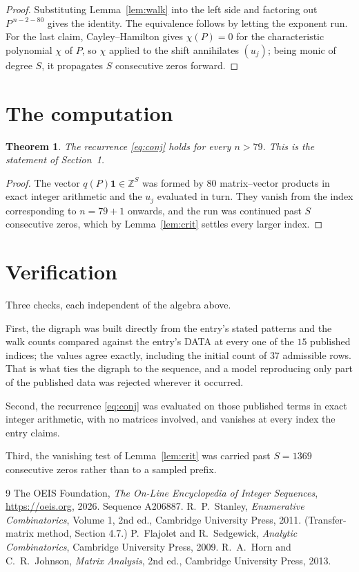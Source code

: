 \documentclass[11pt,a4paper]{article}
\theoremstyle{plain}
\newtheorem{theorem}{Theorem}
\theoremstyle{definition}
\begin{document}
\begin{proof}
Substituting Lemma~\ref{lem:walk} into the left side and factoring out
$P^{\,n-2-80}$ gives the identity. The equivalence follows by letting the exponent
run. For the last claim, Cayley--Hamilton gives $\chi(P)=0$ for the characteristic
polynomial $\chi$ of $P$, so $\chi$ applied to the shift annihilates $(u_j)$; being monic of
degree $S$, it propagates $S$ consecutive zeros forward.
\end{proof}

\section{The computation}

\begin{theorem}
The recurrence \eqref{eq:conj} holds for every $n>79$. This is the statement of
Section~1.
\end{theorem}

\begin{proof}
The vector $q(P)\mathbf{1}\in\mathbb{Z}^{S}$ was formed by $80$ matrix--vector
products in exact integer arithmetic and the $u_j$ evaluated in turn. They vanish from the
index corresponding to $n=79+1$ onwards, and the run was continued past $S$ consecutive
zeros, which by Lemma~\ref{lem:crit} settles every larger index.
\end{proof}

\section{Verification}

Three checks, each independent of the algebra above.

First, the digraph was built directly from the entry's stated patterns and the walk counts
compared against the entry's DATA at every one of the $15$ published indices; the
values agree exactly, including the initial count of $37$ admissible rows. That is
what ties the digraph to the sequence, and a model reproducing only part of the published
data was rejected wherever it occurred.

Second, the recurrence \eqref{eq:conj} was evaluated on those published terms in exact
integer arithmetic, with no matrices involved, and vanishes at every index the entry claims.

Third, the vanishing test of Lemma~\ref{lem:crit} was carried past $S=1369$ consecutive
zeros rather than to a sampled prefix.

\begin{thebibliography}{9}
 The OEIS Foundation, \emph{The On-Line Encyclopedia of Integer
Sequences}, \url{https://oeis.org}, 2026. Sequence A206887.
 R.~P.~Stanley, \emph{Enumerative Combinatorics}, Volume 1, 2nd ed.,
Cambridge University Press, 2011. (Transfer-matrix method, Section 4.7.)
 P.~Flajolet and R.~Sedgewick, \emph{Analytic Combinatorics}, Cambridge
University Press, 2009.
 R.~A.~Horn and C.~R.~Johnson, \emph{Matrix Analysis}, 2nd ed., Cambridge
University Press, 2013.
\end{thebibliography}
\end{document}
